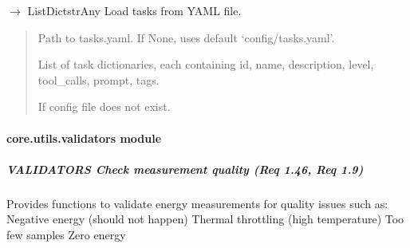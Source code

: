 \documentclass[letterpaper,10pt,english]{sphinxmanual}
\begin{document}

\begin{fulllineitems}
\label{\detokenize{core.utils.task_loader:core.utils.task_loader.load_tasks}}
\pysigstartsignatures
\pysiglinewithargsret
{}
{}
{{ $\rightarrow$ List\DUrole{p}{{[}}Dict\DUrole{p}{{[}}strAny\DUrole{p}{{]}}\DUrole{p}{{]}}}}
\pysigstopsignatures
\sphinxAtStartPar
Load tasks from YAML file.
\begin{quote}\begin{description}
\sphinxAtStartPar
{} \textendash{} Path to tasks.yaml. If None, uses default ‘config/tasks.yaml’.

\sphinxAtStartPar
List of task dictionaries, each containing id, name, description,
level, tool\_calls, prompt, tags.

\sphinxAtStartPar
{} \textendash{} If config file does not exist.

\end{description}\end{quote}

\end{fulllineitems}


\sphinxstepscope


\paragraph{core.utils.validators module}
\label{\detokenize{core.utils.validators:module-core.utils.validators}}\label{\detokenize{core.utils.validators:core-utils-validators-module}}\label{\detokenize{core.utils.validators::doc}}

\subparagraph{VALIDATORS \textendash{} Check measurement quality (Req 1.46, Req 1.9)}
\label{\detokenize{core.utils.validators:validators-check-measurement-quality-req-1-46-req-1-9}}
\sphinxAtStartPar
Provides functions to validate energy measurements for quality issues such as:
\sphinxhyphen{} Negative energy (should not happen)
\sphinxhyphen{} Thermal throttling (high temperature)
\sphinxhyphen{} Too few samples
\sphinxhyphen{} Zero energy
\end{document}
